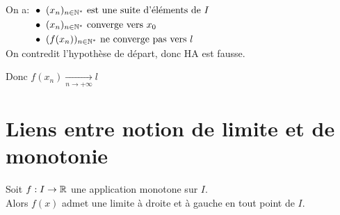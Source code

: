 \documentclass[12pt,twoside,a4paper]{article}
\begin{document}
\begin{preuve}
\begin{liste}
\begin{tab}
					On a: $\begin{aligned}[t]
					&\bullet\ (x_n)_{n\in\mathbb{N}^{*}} \text{ est une suite d'éléments de }I\\
					&\bullet\ (x_n)_{n\in\mathbb{N}^{*}} \text{ converge vers }x_0\\
					&\bullet\ (f(x_n))_{n\in\mathbb{N}^{*}} \text{ ne converge pas vers }l
					\end{aligned}$\\
					On contredit l'hypothèse de départ, donc HA est fausse.
				\end{tab}
				Donc $f\left( x_n\right) \mathop{\longrightarrow}\limits_{n\rightarrow +\infty}l$
			\end{liste}
		\end{preuve}
	\section{Liens entre notion de limite et de monotonie}
		\begin{prop}
			Soit $f:I\rightarrow \mathbb{R}$ une application monotone sur $I$.\\
			Alors $f(x)$ admet une limite \`a droite et \`a gauche en tout point de $I$.
		\end{prop}
\end{document}
